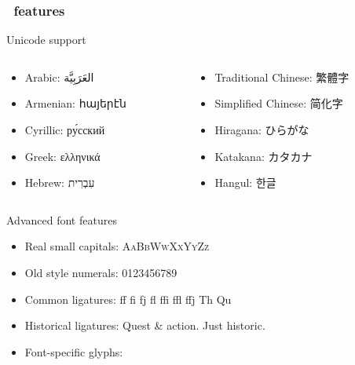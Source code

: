 \documentclass[trans]{beamer}       %
\begin{document}
\begin{frame}%
\frametitle{\XeLaTeX \ features}
  \begin{exampleblock}{Unicode support}
  \begin{columns}[T]
  \begin{column}{.45\textwidth}
  \renewcommand{\baselinestretch}{0.9}
  \begin{itemize}
  \item Arabic: \textarabic{العَرَبِيَّة}
  \item Armenian: { հայերէն }
  \item Cyrillic: ру́сский
  \item Greek: ελληνικά
  \item Hebrew: עִבְרִית
  \end{itemize}
  \end{column}
  \begin{column}{.55\textwidth}
  \renewcommand{\baselinestretch}{0.9}
  \begin{itemize}
  \item Traditional Chinese: 繁體字
  \item Simplified Chinese: 简化字 
  \item Hiragana: {\CJKnospace ひらがな}
  \item Katakana: カタカナ
  \item Hangul: { \CJKspace 한글}
  \end{itemize}
  \end{column}
  \end{columns}
\end{exampleblock}
\begin{exampleblock}{Advanced font features}
\renewcommand{\baselinestretch}{0.9}
\begin{itemize}
  \item Real small capitals: \textsc{AaBbWwXxYyZz}
  \item Old style numerals:  0123456789
  \item Common ligatures: ff fi fj fl ffi ffl ffj Th Qu
  \item Historical ligatures:  Quest \& action. Just historic.
  \item Font-specific glyphs:       
\end{itemize}
\end{exampleblock}
\end{frame}
\end{document}
